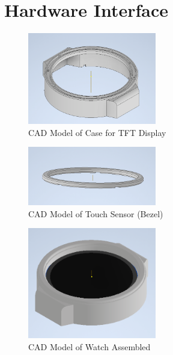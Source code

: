 \documentclass[12pt, titlepage]{article}
\begin{document}
\section{Hardware Interface}
\label{MechHardware}

\begin{figure}[H]
	\begin{center}
		 \includegraphics[width=0.5\textwidth]{DisplayCaseCAD}
		\caption{CAD Model of Case for TFT Display}
		\label{DisplayCaseCAD} 
	\end{center}
\end{figure}

\begin{figure}[H]
	\begin{center}
		 \includegraphics[width=0.5\textwidth]{BezelCAD}
		\caption{CAD Model of Touch Sensor (Bezel)}
		\label{BezelCAD} 
	\end{center}
\end{figure}

\begin{figure}[H]
	\begin{center}
		 \includegraphics[width=0.5\textwidth]{WatchCAD2}
		\caption{CAD Model of Watch Assembled}
		\label{WatchCAD2} 
	\end{center}
\end{figure}
\end{document}
